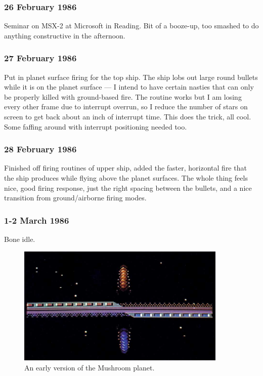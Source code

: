 \subsubsection{26 February 1986}
Seminar on MSX-2 at Microsoft in Reading. Bit of a booze-up, too smashed to do anything constructive in the afternoon.

\subsubsection{27 February 1986}
Put in planet surface firing for the top ship. The ship lobs out large round bullets while it is on the planet surface — I intend to have certain nasties that can only be properly killed with ground-based fire. The routine works but I am losing every other frame due to interrupt overrun, so I reduce the number of stars on screen to get back about an inch of interrupt time. This does the trick, all cool. Some faffing around with interrupt positioning needed too.

\subsubsection{28 February 1986}
Finished off firing routines of upper ship, added the faster, horizontal fire that the ship produces while flying above the planet surfaces. The whole thing feels nice, good firing response, just the right spacing between the bullets, and a nice transition from ground/airborne firing modes.

\subsubsection{1-2 March 1986}
Bone idle.

\begin{figure}[H]
    \centering
      \includegraphics[width=10cm]{src/diary/zzap13_pic3.jpg}%
\caption{An early version of the Mushroom planet.}
\end{figure}

